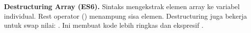 \begin{konsep}
\textbf{Destructuring Array (ES6).} Sintaks  mengekstrak elemen array ke variabel individual. Rest operator () menampung sisa elemen. Destructuring juga bekerja untuk swap nilai: \code{[a, b] = [b, a];}. Ini membuat kode lebih ringkas dan ekspresif \cite{mdnJsGuide}.
\end{konsep}

